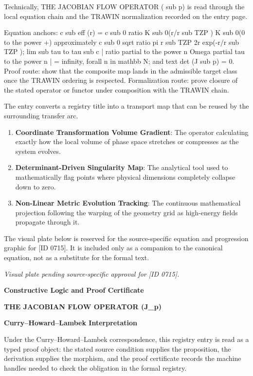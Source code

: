 Technically, THE JACOBIAN FLOW OPERATOR ( sub p) is read through the local equation chain and the TRAWIN normalization recorded on the entry page.

Equation anchors: c sub eff (r) = c sub 0 ratio K sub 0(r/r sub TZP ) K sub 0(0 to the power +) approximately c sub 0 sqrt ratio pi r sub TZP 2r exp(-r/r sub TZP ); lim sub tau to tau sub c | ratio partial to the power n Omega partial tau to the power n | = infinity, forall n in mathbb N; and text det (J sub p) = 0. Proof route: show that the composite map lands in the admissible target class once the TRAWIN ordering is respected. Formalization route: prove closure of the stated operator or functor under composition with the TRAWIN chain.

The entry converts a registry title into a transport map that can be reused by the surrounding transfer arc.
\endgroup

\begin{enumerate}[leftmargin=1.6em,itemsep=6pt,topsep=4pt]
\item \textbf{Coordinate Transformation Volume Gradient}: The operator calculating exactly how the local volume of phase space stretches or compresses as the system evolves.
\item \textbf{Determinant-Driven Singularity Map}: The analytical tool used to mathematically flag points where physical dimensions completely collapse down to zero.
\item \textbf{Non-Linear Metric Evolution Tracking}: The continuous mathematical projection following the warping of the geometry grid as high-energy fields propagate through it.
\end{enumerate}

\begingroup\footnotesize\sloppy
The visual plate below is reserved for the source-specific equation and progression graphic for [ID 0715]. It is included only as a companion to the canonical equation, not as a substitute for the formal text.
\par\endgroup
\begingroup\footnotesize\itshape
Visual plate pending source-specific approval for [ID 0715].
\par\endgroup

\clearpage
\begingroup\tzpsupportsetup
\noindent\textbf{\fontsize{10.8pt}{12.8pt}\selectfont [ID 0715] Constructive Logic and Proof Certificate}\par
\noindent\textbf{\fontsize{10pt}{12pt}\selectfont THE JACOBIAN FLOW OPERATOR (J\_p)}\par
\vspace{0.45em}
\begingroup
\footnotesize
\setlength{\parskip}{0.22em}
\setlength{\parindent}{0pt}
\noindent\textbf{Curry--Howard--Lambek Interpretation}\par
Under the Curry--Howard--Lambek correspondence, this registry entry is read as a typed proof
object: the stated source condition supplies the proposition, the derivation supplies the
morphism, and the proof certificate records the machine handles needed to check the obligation
in the formal registry.

